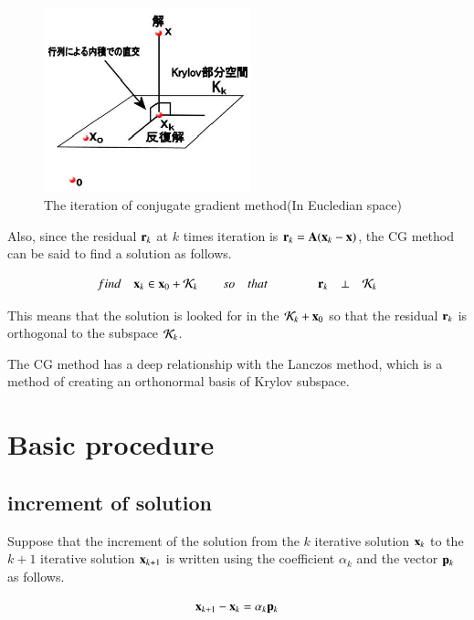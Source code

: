 \begin{figure}
\begin{center}
\includegraphics[width=6cm]{images/cg_projector.eps}
\caption{The iteration of conjugate gradient method(In Eucledian space)}
\end{center}
\end{figure}

Also, since the residual $\mathbf{r}_k$ at $k$ times iteration is $\mathbf{r}_k=\mathbf{A}(\mathbf{x}_k-\mathbf{x})$, the CG method can be said to find a solution as follows.

\begin{equation}
find \quad \mathbf{x}_k\in\mathbf{x}_0+{\cal K}_k \qquad so \quad that \qquad \qquad \mathbf{r}_k\quad\bot\quad{\cal K}_k
\end{equation}


This means that the solution  is looked for in the ${\cal K}_k+\mathbf{x}_0$ so that the residual $\mathbf{r}_k$ is orthogonal to the subspace ${\cal K}_k$.

The CG method has a deep relationship with the Lanczos method, which is a method of creating an orthonormal basis of Krylov subspace.



\section{Basic procedure}





\subsection{increment of solution}


Suppose that the increment of the solution from the $k$ iterative solution $\mathbf{x}_{k}$ to the $k+1$ iterative solution $\mathbf{x}_{k+1}$ is written using the coefficient $\alpha_k$ and the vector $\mathbf{p}_k$ as follows.


\begin{equation}
\mathbf{x}_{k+1}-\mathbf{x}_{k}=\alpha_{k}\mathbf{p}_{k}
\end{equation}


